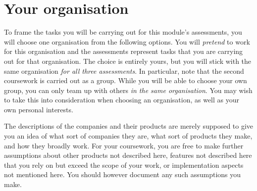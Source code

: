 
\section{Your organisation}
\label{sec:organisations}

To frame the tasks you will be carrying out for this module's assessments, you will choose one organisation from the following options. You will \emph{pretend} to work for this organisation and the assessments represent tasks that you are carrying out for that organisation. The choice is entirely yours, but you will stick with the same organisation \emph{for all three assessments}. In particular, note that the second coursework is carried out as a group. While you will be able to choose your own group, you can only team up with others \emph{in the same organisation}. You may wish to take this into consideration when choosing an organisation, as well as your own personal interests.

The descriptions of the companies and their products are merely supposed to give you an idea of what sort of companies they are, what sort of products they make, and how they broadly work. For your coursework, you are free to make further assumptions about other products not described here, features not described here that you rely on but exceed the scope of your work, or implementation aspects not mentioned here. You should however document any such assumptions you make.



